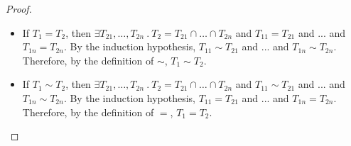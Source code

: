 \documentclass[a4paper]{article}
\begin{document}
\begin{proof}
\begin{itemize}
\begin{itemize}
        \item If $T_1 = T_2$, then $\exists T_{21}, \ldots, T_{2n}\ .\ T_2 = T_{21} \cap \ldots \cap T_{2n}$ and $T_{11} = T_{21}$ and ... and $T_{1n} = T_{2n}$.
        By the induction hypothesis, $T_{11} \sim T_{21}$ and ... and $T_{1n} \sim T_{2n}$.
        Therefore, by the definition of $\sim$, $T_1 \sim T_2$.
        \item If $T_1 \sim T_2$, then $\exists T_{21}, \ldots, T_{2n}\ .\ T_2 = T_{21} \cap \ldots \cap T_{2n}$ and $T_{11} \sim T_{21}$ and ... and $T_{1n} \sim T_{2n}$.
        By the induction hypothesis, $T_{11} = T_{21}$ and ... and $T_{1n} = T_{2n}$.
        Therefore, by the definition of $=$, $T_1 = T_2$.
    \end{itemize}
\end{itemize}
\end{proof}
\end{document}
